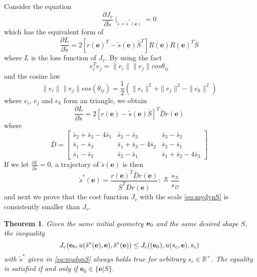 \documentclass[times]{rncauth}
\newcommand{\be}{\ensuremath \mathbf{e}}
\newtheorem{thm}{Theorem}[section]
\begin{document}
Consider the equation
\begin{equation}\label{eq:temp1}
  \frac{\partial J_v}{\partial \tilde{s}}\mid_{\tilde{s}=\tilde{s}^*(\mathbf{e})}=0
\end{equation}
which has the equivalent form of
\begin{equation}
  \frac{\partial L}{\partial \tilde{s}}=2[r(\mathbf{e})^T-\tilde{s}(\mathbf{e})\bar{S}^T]
  R(\mathbf{e}) R(\mathbf{e})^T \bar{S}
  \end{equation}
  where $L$ is the loss function of $J_v$.
By using the fact  $$e^T_i e_j=\|e_i\|\|e_j\|cos\theta_{ij}$$ and
the cosine law
$$\|e_i\|\|e_j\|cos(\theta_{ij})=\frac{1}{2}(\|e_i\|^2+\|e_j\|^2-\|e_k\|^2)$$
where $e_i$, $e_j$ and $e_k$ form an triangle, we obtain
\begin{equation}
  \frac{\partial L}{\partial \tilde{s}}=2[r(\mathbf{e})-\tilde{s}(\mathbf{e})\bar{S}]^T \bar{D} r(\mathbf{e})
\end{equation}
where
\begin{equation}\label{eq:D_three}\bar{D}=\begin{bmatrix}
\bar{s}_2+\bar{s}_3-4\bar{s}_1& \bar{s}_2-\bar{s}_3& \bar{s}_3-\bar{s}_2\\
\bar{s}_1-\bar{s}_3 & \bar{s}_1+\bar{s}_3-4\bar{s}_2 & \bar{s}_3-\bar{s}_1\\
\bar{s}_1-\bar{s}_2 &\bar{s}_2-\bar{s}_1
&\bar{s}_1+\bar{s}_2-4\bar{s}_3\end{bmatrix}\end{equation} If we let
$\frac{\partial L}{\partial \tilde{s}}=0$,  a trajectory of
$\tilde{s}(\mathbf{e})$ is then
\begin{equation}\label{eq:mydynS}
  \tilde{s}^*(\mathbf{e})=\frac{r(\mathbf{e})^T \bar{D} r(\mathbf{e})}{\bar{S}^T \bar{D} r(\mathbf{e})}:\triangleq
  \frac{s_N}{s_D}
\end{equation}
and next we prove that the cost function $J_v$ with the scale
 \eqref{eq:mydynS} is consistently smaller than $J_c$.
\begin{thm}\label{thm:JvJc}
  Given the same initial geometry $\be_0$ and the same desired shape $S$, the inequality
  $$J_v(\mathbf{e}_0,u(\tilde{s}^*(\mathbf{e}),\be),\tilde{s}^*(\mathbf{e}))\leq J_c((\mathbf{e}_0),u(s_c,\be),s_c)$$
  with $\tilde{s}^*$ given in \eqref{eq:mydynS}
  always holds true for arbitrary $s_c\in \mathbb{R}^+$. The
  equality is satisfied if and only if $\mathbf{e}_0\in
  \{\mathbf{e}|S\}$.
\end{thm}
\end{document}
